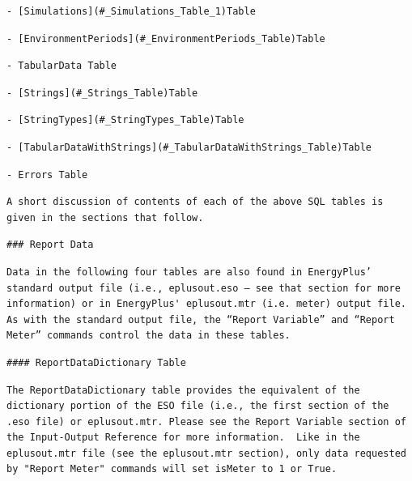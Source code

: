 \begin{lstlisting}
- [Simulations](#_Simulations_Table_1)Table
\end{lstlisting}

\begin{lstlisting}
- [EnvironmentPeriods](#_EnvironmentPeriods_Table)Table
\end{lstlisting}

\begin{lstlisting}
- TabularData Table
\end{lstlisting}

\begin{lstlisting}
- [Strings](#_Strings_Table)Table
\end{lstlisting}

\begin{lstlisting}
- [StringTypes](#_StringTypes_Table)Table
\end{lstlisting}

\begin{lstlisting}
- [TabularDataWithStrings](#_TabularDataWithStrings_Table)Table
\end{lstlisting}

\begin{lstlisting}
- Errors Table
\end{lstlisting}

\begin{lstlisting}
A short discussion of contents of each of the above SQL tables is given in the sections that follow.
\end{lstlisting}

\begin{lstlisting}
### Report Data
\end{lstlisting}

\begin{lstlisting}
Data in the following four tables are also found in EnergyPlus’ standard output file (i.e., eplusout.eso – see that section for more information) or in EnergyPlus' eplusout.mtr (i.e. meter) output file. As with the standard output file, the “Report Variable” and “Report Meter” commands control the data in these tables.
\end{lstlisting}

\begin{lstlisting}
#### ReportDataDictionary Table
\end{lstlisting}

\begin{lstlisting}
The ReportDataDictionary table provides the equivalent of the dictionary portion of the ESO file (i.e., the first section of the .eso file) or eplusout.mtr. Please see the Report Variable section of the Input-Output Reference for more information.  Like in the eplusout.mtr file (see the eplusout.mtr section), only data requested by "Report Meter" commands will set isMeter to 1 or True.
\end{lstlisting}

